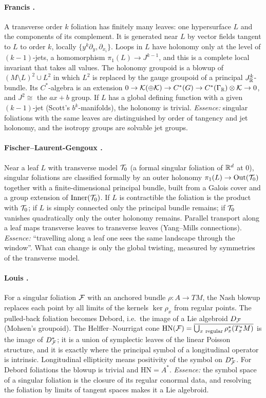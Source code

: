 \paragraph{Francis \cite{Francis}.} A transverse order $k$ foliation has finitely many leaves: one hypersurface $L$ and the components
of its complement. It is generated near $L$ by vector fields tangent to $L$ to order $k$, locally $\{y^k\partial_y,\partial_{x_i}\}$. Loops
in $L$ have holonomy only at the level of $(k-1)$-jets, a homomorphism $\pi_1(L)\to J^{k-1}$, and this is a complete local invariant that
takes all values. The holonomy groupoid is a blowup of $(M\setminus L)^2\cup L^2$ in which $L^2$ is replaced by the gauge groupoid of a
principal $J^k_{\mathbb R}$-bundle. Its $C^*$-algebra is an extension $0\to\mathcal K(\oplus\mathcal K)\to C^*(G)\to C^*(\Gamma_{\mathbb R})\otimes\mathcal
K\to0$, and $J^2\cong$ the $ax+b$ group. If $L$ has a global defining function with a given $(k-1)$-jet (Scott's $b^k$-manifolds), the holonomy
is trivial. \emph{Essence:} singular foliations with the same leaves are distinguished by order of tangency and jet holonomy, and the
isotropy groups are solvable jet groups.

\paragraph{Fischer--Laurent-Gengoux \cite{FLG}.} Near a leaf $L$ with transverse model $\mathcal T_0$ (a formal singular foliation of
$\mathbb R^d$ at $0$), singular foliations are classified formally by an outer holonomy $\pi_1(L)\to\mathrm{Out}(\mathcal T_0)$ together with a
finite-dimensional principal bundle, built from a Galois cover and a group extension of $\mathrm{Inner}(\mathcal T_0)$. If $L$ is contractible the
foliation is the product with $\mathcal T_0$; if $L$ is simply connected only the principal bundle remains; if $\mathcal T_0$ vanishes quadratically
only the outer holonomy remains. Parallel transport along a leaf maps transverse leaves to transverse leaves (Yang--Mills
connections). \emph{Essence:} ``travelling along a leaf one sees the same landscape through the window''. What can change is only the
global twisting, measured by symmetries of the transverse model.

\paragraph{Louis \cite{Louis}.} For a singular foliation $\mathcal F$ with an anchored bundle $\rho:A\to TM$, the Nash blowup replaces each point by
all limits of the kernels $\ker\rho_x$ from regular points. The pulled-back foliation becomes Debord, i.e.\ the image of a Lie algebroid
$D_\mathcal F$ (Mohsen's groupoid). The Helffer--Nourrigat cone $\mathrm{HN}(\cF)=\overline{\bigcup_{x\ \mathrm{regular}}\rho^*_x(T^*_xM)}$ is the image
of $D^*_\mathcal F$; it is a union of symplectic leaves of the linear Poisson structure, and it is exactly where the principal symbol of a
longitudinal operator is intrinsic. Longitudinal ellipticity means positivity of the symbol on $D_\mathcal F^*$. For Debord foliations the
blowup is trivial and $\mathrm{HN}=A^*$. \emph{Essence:} the symbol space of a singular foliation is the closure of its regular conormal
data, and resolving the foliation by limits of tangent spaces makes it a Lie algebroid.
